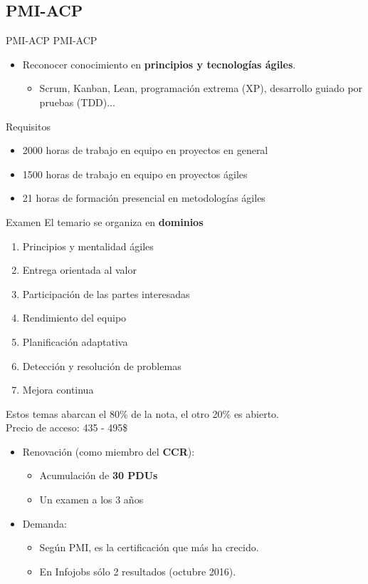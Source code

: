 \subsection{PMI-ACP}
\begin{frame}[allowframebreaks]{PMI-ACP}
	PMI-ACP 
	\begin{itemize}
		\item Reconocer conocimiento en \textbf{principios y tecnologías ágiles}.
		\begin{itemize}
			\item Scrum, Kanban, Lean, programación extrema (XP), desarrollo guiado por pruebas (TDD)...
		\end{itemize}
	\end{itemize}
	\begin{block}{Requisitos}
		\begin{itemize}
			\item 2000 horas de trabajo en equipo en proyectos en general
			\item 1500 horas de trabajo en equipo en proyectos ágiles
			\item 21 horas de formación presencial en metodologías ágiles
		\end{itemize}
	\end{block}
	\begin{block}{Examen}
		El temario se organiza en \textbf{dominios}
		\begin{enumerate}
			\item Principios y mentalidad ágiles
			\item Entrega orientada al valor
			\item Participación de las partes interesadas
			\item Rendimiento del equipo
			\item Planificación adaptativa
			\item Detección y resolución de problemas
			\item Mejora continua
		\end{enumerate}
		Estos temas abarcan el 80\% de la nota, el otro 20\% es abierto.\\
		Precio de acceso: 435 - 495\$
	\end{block}
	
	\framebreak
	
	\begin{itemize}
		\item Renovación (como miembro del \textbf{CCR}):
		\begin{itemize}
			\item Acumulación de \textbf{30 PDUs}
			\item Un examen a los 3 años
		\end{itemize}
		\item Demanda:
		\begin{itemize}
			\item Según PMI, es la certificación que más ha crecido.
			\item En Infojobs sólo 2 resultados (octubre 2016).
		\end{itemize}
	\end{itemize}
\end{frame}

